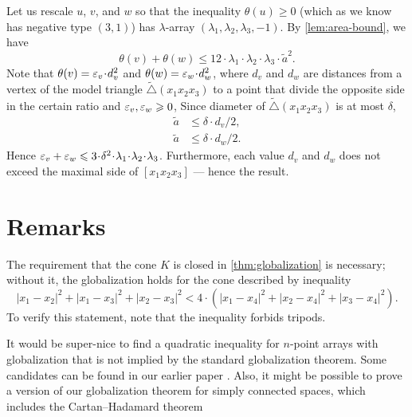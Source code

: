 \documentclass[a4paper,10pt]{article}
\begin{document}
Let us rescale $u$, $v$, and $w$ so that the inequality $\theta(u)\ge 0$ (which as we know has negative type $(3,1)$)
has $\lambda$-array $(\lambda_1,\lambda_2,\lambda_3,-1)$.
By \ref{lem:area-bound}, we have
\[\theta(v)+\theta(w)
\le
12\cdot\lambda_1\cdot\lambda_2\cdot\lambda_3\cdot\tilde a^2.\]
Note that $\theta(v)=\eps_v\cdot d_v^2$ and $\theta(w)=\eps_w\cdot d_w^2$, where
$d_v$ and $d_w$ are distances from a vertex of the model triangle $\tilde\triangle(x_1x_2x_3)$ to a point that divide the opposite side in the certain ratio and $\varepsilon_v,\varepsilon_w\geqslant 0$,
Since diameter of $\tilde\triangle(x_1x_2x_3)$ is at most $\delta$,
\begin{align*}
\tilde a&\le \delta\cdot d_v/2,
\\
\tilde a&\le \delta\cdot d_w/2.
\end{align*}
Hence $\eps_v+\eps_w\le 3\cdot \delta^2\cdot\lambda_1\cdot\lambda_2\cdot\lambda_3$.
Furthermore, each value $d_v$ and $d_w$ does not exceed the maximal side of $[x_1x_2x_3]$ --- hence the result.
\qeds

\section{Remarks}

The requirement that the cone $K$ is closed in \ref{thm:globalization} is necessary;
without it, the globalization holds for the cone described by inequality
\[|x_1-x_2|^2+|x_1-x_3|^2+|x_2-x_3|^2<4\cdot(|x_1-x_4|^2+|x_2-x_4|^2+|x_3-x_4|^2).\]
To verify this statement, note that the inequality forbids tripods.

It would be super-nice to find a quadratic inequality for $n$-point arrays with globalization that is not implied by the standard globalization theorem.
Some candidates can be found in our earlier paper \cite{lebedeva-petrunin-zolotov}.
Also, it might be possible to prove a version of our globalization theorem
for simply connected spaces, which includes the Cartan--Hadamard theorem

{\sloppy
\def\emph{\textit}
\printbibliography[heading=bibintoc]
\fussy
}
\end{document}

